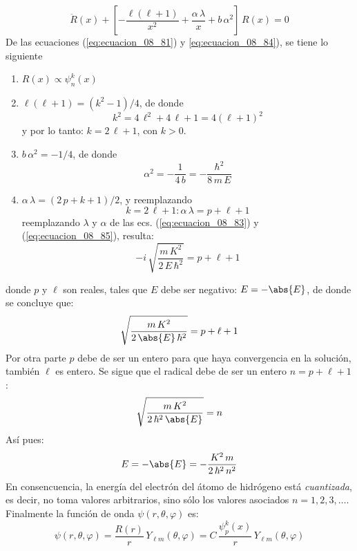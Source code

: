 \begin{equation}
\ddot{R} (x) + \left[ - \dfrac{\ell (\ell + 1)}{x^{2}} + \dfrac{\alpha \, \lambda}{x} + b \, \alpha^{2} \right] \, R (x) = 0
\label{eq:ecuacion_08_84}
\end{equation}
De las ecuaciones (\ref{eq:ecuacion_08_81}) y \ref{eq:ecuacion_08_84}), se tiene lo siguiente
\begin{enumerate}[label=\roman*.)]
\item $R(x) \propto \psi_{n}^{k} (x)$
\item $\ell (\ell + 1) = (k^{2} - 1)/4$, de donde
\[ k^{2} = 4 \, \ell^{2} + 4 \, \ell + 1 = 4 (\ell + 1)^{2} \]
y por lo tanto: $k = 2 \, \ell + 1$, con $k > 0$.
\item $b \,\alpha^{2} = - 1/4$, de donde
\begin{equation}
\alpha^{2} =  - \dfrac{1}{4 \, b} = - \dfrac{\hbar^{2}}{8 \, m \, E}
\label{eq:ecuacion_08_85}
\end{equation}
\item $\alpha \, \lambda = (2 \, p + k + 1)/2$, y reemplazando 
\[ k =  2 \, \ell + 1 : \alpha \, \lambda = p + \ell +1 \]
reemplazando $\lambda$ y $\alpha$ de las ecs. (\ref{eq:ecuacion_08_83}) y (\ref{eq:ecuacion_08_85}), resulta:
\[- i \, \sqrt{\dfrac{m \, K^{2}}{2 \, E \, \hbar^{2}}} = p + \ell + 1 \]
\end{enumerate}
donde $p$ y $\ell$ son reales, tales que $E$ debe ser negativo: $E = - \abs{E}$, de donde se concluye que:
\[ \sqrt{\dfrac{m \, K^{2}}{2 \, \abs{E} \, \hbar^{2}}} = p + \ell + 1 \]
Por otra parte $p$ debe de ser un entero para que haya convergencia en la solución, también $\ell$ es entero. Se sigue que el radical debe de ser un entero $n = p + \ell + 1$:
\[ \sqrt{\dfrac{m \, K^{2}}{2 \, \hbar^{2} \, \abs{E}}} = n \]
Así pues:
\[ E = - \abs{E} = - \dfrac{K^{2} \, m}{2 \, \hbar^{2} \, n^{2}} \]
En consencuencia, la energía del electrón del átomo de hidrógeno está \emph{cuantizada}, es decir, no toma valores arbitrarios, sino sólo los valores asociados $n = 1, 2, 3, \ldots$. Finalmente la función de onda $\psi (r, \theta, \varphi)$ es:
\[ \psi (r, \theta, \varphi) =  \dfrac{R(r)}{r} \, Y_{\ell m} (\theta, \varphi) = C \, \dfrac{\psi_{p}^{k} (x)}{r} \, Y_{\ell m} (\theta, \varphi) \] 




